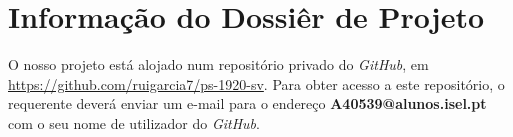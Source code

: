 %
%
%
\chapter{Informação do Dossiêr de Projeto} \label{an:a}

O nosso projeto está alojado num repositório privado do \textit{GitHub}, em \url{https://github.com/ruigarcia7/ps-1920-sv}. Para obter acesso a este repositório, o requerente deverá enviar um e-mail para o endereço \textbf{A40539@alunos.isel.pt} com o seu nome de utilizador do \textit{GitHub}.